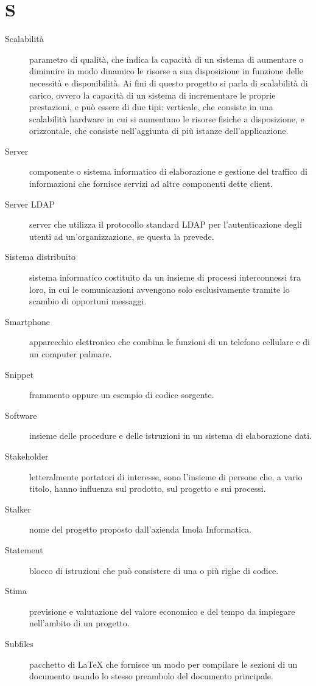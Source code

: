 \documentclass{article}
\begin{document}
  \section{S}
  \begin{description}
    \item[Scalabilità] parametro di qualità, che indica la capacità di un sistema di aumentare o diminuire in modo dinamico le risorse a sua disposizione in funzione delle necessità e disponibilità. Ai fini di questo progetto si parla di scalabilità di carico, ovvero la capacità di un sistema di incrementare le proprie prestazioni, e può essere di due tipi: verticale, che consiste in una scalabilità hardware in cui si aumentano le risorse fisiche a disposizione, e orizzontale, che consiste nell'aggiunta di più istanze dell'applicazione.
    \item[Server] componente o sistema informatico di elaborazione e gestione del traffico di informazioni che fornisce servizi ad altre componenti dette client.
    \item[Server LDAP] server che utilizza il protocollo standard LDAP per l'autenticazione degli utenti ad un'organizzazione, se questa la prevede.
    \item[Sistema distribuito] sistema informatico costituito da un insieme di processi interconnessi tra loro, in cui le comunicazioni avvengono solo esclusivamente tramite lo scambio di opportuni messaggi.
    \item[Smartphone] apparecchio elettronico che combina le funzioni di un telefono cellulare e di un computer palmare.
    \item[Snippet] frammento oppure un esempio di codice sorgente.
    \item[Software] insieme delle procedure e delle istruzioni in un sistema di elaborazione dati.
    \item[Stakeholder] letteralmente portatori di interesse, sono l’insieme di persone che, a vario titolo, hanno influenza sul prodotto, sul progetto e sui processi.
    \item[Stalker] nome del progetto proposto dall'azienda Imola Informatica.
    \item[Statement] blocco di istruzioni che può consistere di una o più righe di codice.
    \item[Stima] previsione e valutazione del valore economico e del tempo da impiegare nell'ambito di un progetto.
    \item[Subfiles] pacchetto di LaTeX che fornisce un modo per compilare le sezioni di un documento usando lo stesso preambolo del documento principale.

\end{description}
\end{document}
